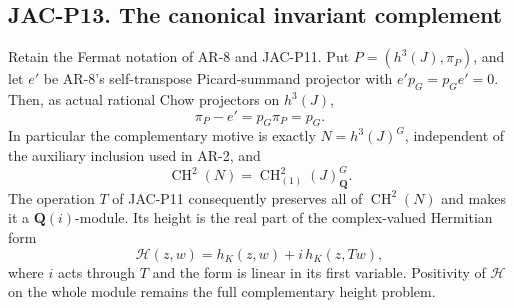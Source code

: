 
\subsection*{JAC-P13. The canonical invariant complement}

\begin{proposition}[JAC-P13]\label{jac:P13}
Retain the Fermat notation of AR-8 and JAC-P11. Put
$P=(h^3(J),\pi_P)$, and let $e'$ be AR-8's self-transpose
Picard-summand projector with $e'p_G=p_Ge'=0$.
Then, as actual rational Chow projectors on $h^3(J)$,
\[
 \pi_P-e'=p_G\pi_P=p_G.                               \tag{JAC.P13.1}
\]
In particular the complementary motive is exactly
$N=h^3(J)^G$, independent of the auxiliary inclusion used in AR-2,
and
\[
 \operatorname{CH}^2(N)
       =\operatorname{CH}^2_{(1)}(J)_{\mathbf Q}^{G}.    \tag{JAC.P13.2}
\]
The operation $T$ of JAC-P11 consequently preserves all of
$\operatorname{CH}^2(N)$ and makes it a $\mathbf Q(i)$-module.
Its height is the real part of the complex-valued Hermitian form
\[
 \mathscr H(z,w)=h_K(z,w)+i\,h_K(z,Tw),                 \tag{JAC.P13.3}
\]
where $i$ acts through $T$ and the form is linear in its first
variable. Positivity of $\mathscr H$ on the whole module remains
the full complementary height problem.
\end{proposition}

